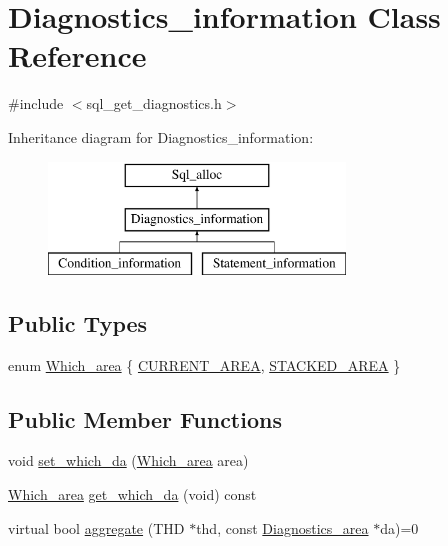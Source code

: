 \hypertarget{classDiagnostics__information}{}\section{Diagnostics\+\_\+information Class Reference}
\label{classDiagnostics__information}


{\ttfamily \#include $<$sql\+\_\+get\+\_\+diagnostics.\+h$>$}

Inheritance diagram for Diagnostics\+\_\+information\+:\begin{figure}[H]
\begin{center}
\leavevmode
\includegraphics[height=3.000000cm]{classDiagnostics__information}
\end{center}
\end{figure}
\subsection*{Public Types}
\begin{DoxyCompactItemize}
\item 
enum \mbox{\hyperlink{classDiagnostics__information_a87e497725c87366dd3af8cafe74fc624}{Which\+\_\+area}} \{ \mbox{\hyperlink{classDiagnostics__information_a87e497725c87366dd3af8cafe74fc624a748fd638d5316894a8ee58beaa23008a}{C\+U\+R\+R\+E\+N\+T\+\_\+\+A\+R\+EA}}, 
\mbox{\hyperlink{classDiagnostics__information_a87e497725c87366dd3af8cafe74fc624a0227135d55506f0db7064e4c0e962120}{S\+T\+A\+C\+K\+E\+D\+\_\+\+A\+R\+EA}}
 \}
\end{DoxyCompactItemize}
\subsection*{Public Member Functions}
\begin{DoxyCompactItemize}
\item 
void \mbox{\hyperlink{classDiagnostics__information_a6028d068edb45a088afe02639c4cbab7}{set\+\_\+which\+\_\+da}} (\mbox{\hyperlink{classDiagnostics__information_a87e497725c87366dd3af8cafe74fc624}{Which\+\_\+area}} area)
\item 
\mbox{\hyperlink{classDiagnostics__information_a87e497725c87366dd3af8cafe74fc624}{Which\+\_\+area}} \mbox{\hyperlink{classDiagnostics__information_aa6e10915b239cfb7372890568168abb9}{get\+\_\+which\+\_\+da}} (void) const
\item 
virtual bool \mbox{\hyperlink{classDiagnostics__information_a5181f11d3ef8554e1989a882bc2504dc}{aggregate}} (T\+HD $\ast$thd, const \mbox{\hyperlink{classDiagnostics__area}{Diagnostics\+\_\+area}} $\ast$da)=0
\end{DoxyCompactItemize}
